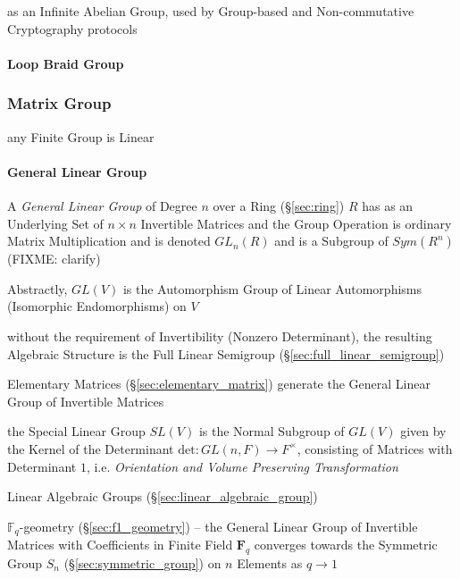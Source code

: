 as an Infinite Abelian Group, used by Group-based and Non-commutative
Cryptography protocols



\paragraph{Loop Braid Group}\label{sec:loop_braid_group}\hfill



\subsubsection{Matrix Group}\label{sec:matrix_group}

any Finite Group is Linear



\paragraph{General Linear Group}\label{sec:general_linear_group}\hfill

A \emph{General Linear Group} of Degree $n$ over a Ring (\S\ref{sec:ring}) $R$
has as an Underlying Set of $n \times n$ Invertible Matrices and the Group
Operation is ordinary Matrix Multiplication and is denoted $GL_n(R)$ and is a
Subgroup of $Sym(R^n)$ (FIXME: clarify)

Abstractly, $GL(V)$ is the Automorphism Group of Linear Automorphisms
(Isomorphic Endomorphisms) on $V$

without the requirement of Invertibility (Nonzero Determinant), the resulting
Algebraic Structure is the Full Linear Semigroup
(\S\ref{sec:full_linear_semigroup})

Elementary Matrices (\S\ref{sec:elementary_matrix}) generate the General Linear
Group of Invertible Matrices

the Special Linear Group $SL(V)$ is the Normal Subgroup of $GL(V)$ given by the
Kernel of the Determinant $\mathrm{det} : GL(n,F) \rightarrow F^\times$,
consisting of Matrices with Determinant $1$, i.e. \emph{Orientation and Volume
  Preserving Transformation}

\fist Linear Algebraic Groups (\S\ref{sec:linear_algebraic_group})

\fist $\mathbb{F}_q$-geometry (\S\ref{sec:f1_geometry}) -- the General Linear
Group of Invertible Matrices with Coefficients in Finite Field $\mathbf{F}_q$
converges towards the Symmetric Group $S_n$ (\S\ref{sec:symmetric_group}) on $n$
Elements as $q \rightarrow 1$

